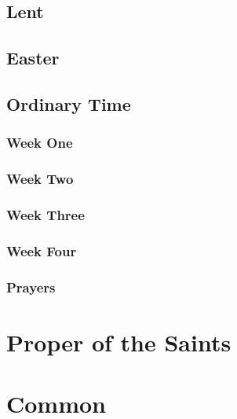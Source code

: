 \documentclass[12pt,twoside,a5paper]{memoir}
\begin{document}
\chapter*[Lent]{Lent}
\clearpage











\chapter*[Easter]{Easter}
\clearpage

\clearpage









\chapter*[Ordinary Time]{Ordinary Time}
\clearpage
%
\section*{Week One}
\section*{Week Two}
\section*{Week Three}
\section*{Week Four}
\section*{Prayers}
\part*{Proper of the Saints}
\part*{Common}
\end{document}
